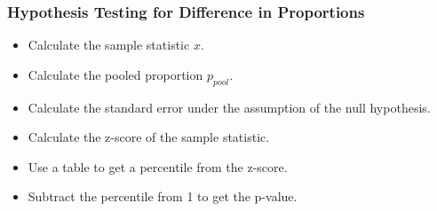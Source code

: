 \documentclass{beamer}
\begin{document}
\begin{frame}
  \frametitle{Hypothesis Testing for Difference in Proportions}
  \begin{itemize}
    \item[] 
      Calculate the sample statistic $x$. 
      \vspace{0.5cm}
    \item[] 
      Calculate the pooled proportion $p_{pool}$. 
      \vspace{0.5cm}
    \item[] 
      Calculate the standard error under the assumption of the null
      hypothesis.
      \vspace{0.5cm}
    \item[] 
      Calculate the z-score of the sample statistic.
      \vspace{0.5cm}
    \item[] 
      Use a table to get a percentile from the z-score.
      \vspace{0.5cm}
    \item[] 
      Subtract the percentile from 1 to get the p-value.
  \end{itemize}
\end{frame}
\end{document}
